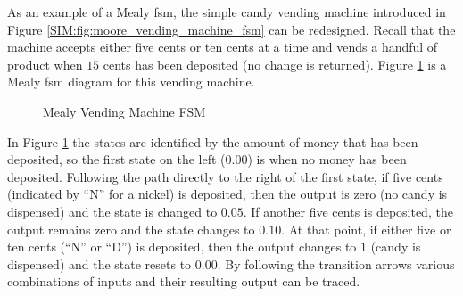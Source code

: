 As an example of a Mealy \gls{fsm}, the simple candy vending machine introduced in Figure \ref{SIM:fig:moore_vending_machine_fsm} can be redesigned. Recall that the machine accepts either five cents or ten cents at a time and vends a handful of product when $ 15 $ cents has been deposited (no change is returned). Figure \ref{SIM:fig:mealy_vending_machine_fsm} is a Mealy \gls{fsm} diagram for this vending machine.

\begin{figure}[H]
  \caption{Mealy Vending Machine FSM}
  \label{SIM:fig:mealy_vending_machine_fsm}
  \myfloatalign
\end{figure}

In Figure \ref{SIM:fig:mealy_vending_machine_fsm} the states are identified by the amount of money that has been deposited, so the first state on the left ($ 0.00 $) is when no money has been deposited. Following the path directly to the right of the first state, if five cents (indicated by ``N'' for a nickel) is deposited, then the output is zero (no candy is dispensed) and the state is changed to $ 0.05 $. If another five cents is deposited, the output remains zero and the state changes to $ 0.10 $. At that point, if either five or ten cents (``N'' or ``D'') is deposited, then the output changes to $ 1 $ (candy is dispensed) and the state resets to $ 0.00 $. By following the transition arrows various combinations of inputs and their resulting output can be traced.

